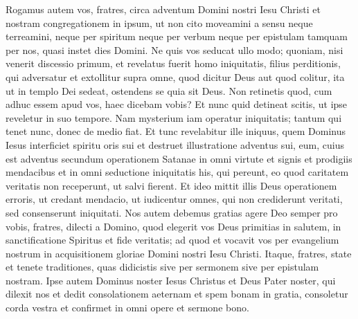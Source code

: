 \begin{biblechapter} 
\verse Rogamus autem vos, fratres, circa adventum Domini nostri Iesu Christi et nostram congregationem in ipsum, 
\verse ut non cito moveamini a sensu neque terreamini, neque per spiritum neque per verbum neque per epistulam tamquam per nos, quasi instet dies Domini. 
\verse Ne quis vos seducat ullo modo; quoniam, nisi venerit discessio primum, et revelatus fuerit homo iniquitatis, filius perditionis, 
\verse qui adversatur et extollitur supra omne, quod dicitur Deus aut quod colitur, ita ut in templo Dei sedeat, ostendens se quia sit Deus. 
\verse Non retinetis quod, cum adhuc essem apud vos, haec dicebam vobis? 
\verse Et nunc quid detineat scitis, ut ipse reveletur in suo tempore. 
\verse Nam mysterium iam operatur iniquitatis; tantum qui tenet nunc, donec de medio fiat. 
\verse Et tunc revelabitur ille iniquus, quem Dominus Iesus interficiet spiritu oris sui et destruet illustratione adventus sui, 
\verse eum, cuius est adventus secundum operationem Satanae in omni virtute et signis et prodigiis mendacibus 
\verse et in omni seductione iniquitatis his, qui pereunt, eo quod caritatem veritatis non receperunt, ut salvi fierent. 
\verse Et ideo mittit illis Deus operationem erroris, ut credant mendacio, 
\verse ut iudicentur omnes, qui non crediderunt veritati, sed consenserunt iniquitati. 
\verse Nos autem debemus gratias agere Deo semper pro vobis, fratres, dilecti a Domino, quod elegerit vos Deus primitias in salutem, in sanctificatione Spiritus et fide veritatis; 
\verse ad quod et vocavit vos per evangelium nostrum in acquisitionem gloriae Domini nostri Iesu Christi. 
\verse Itaque, fratres, state et tenete traditiones, quas didicistis sive per sermonem sive per epistulam nostram. 
\verse Ipse autem Dominus noster Iesus Christus et Deus Pater noster, qui dilexit nos et dedit consolationem aeternam et spem bonam in gratia, 
\verse consoletur corda vestra et confirmet in omni opere et sermone bono. 
\end{biblechapter}

